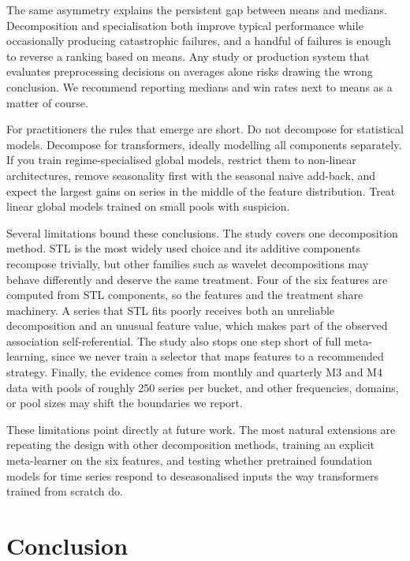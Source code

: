 \documentclass[pdflatex,sn-mathphys-num]{sn-jnl}
\theoremstyle{thmstyleone}
\theoremstyle{thmstyletwo}
\theoremstyle{thmstylethree}
\begin{document}
The same asymmetry explains the persistent gap between means and medians.
Decomposition and specialisation both improve typical performance while
occasionally producing catastrophic failures, and a handful of failures is
enough to reverse a ranking based on means. Any study or production system
that evaluates preprocessing decisions on averages alone risks drawing the
wrong conclusion. We recommend reporting medians and win rates next to means
as a matter of course.

For practitioners the rules that emerge are short. Do not decompose for
statistical models. Decompose for transformers, ideally modelling all
components separately. If you train regime-specialised global models, restrict
them to non-linear architectures, remove seasonality first with the seasonal
naive add-back, and expect the largest gains on series in the middle of the
feature distribution. Treat linear global models trained on small pools with
suspicion.

Several limitations bound these conclusions. The study covers one
decomposition method. STL is the most widely used choice and its additive
components recompose trivially, but other families such as wavelet
decompositions may behave differently and deserve the same treatment. Four of
the six features are computed from STL components, so the features and the
treatment share machinery. A series that STL fits poorly receives both an
unreliable decomposition and an unusual feature value, which makes part of the
observed association self-referential. The study also stops one step short of
full meta-learning, since we never train a selector that maps features to a
recommended strategy. Finally, the evidence comes from monthly and quarterly
M3 and M4 data with pools of roughly 250 series per bucket, and other
frequencies, domains, or pool sizes may shift the boundaries we report.

These limitations point directly at future work. The most natural extensions
are repeating the design with other decomposition methods, training an
explicit meta-learner on the six features, and testing whether pretrained
foundation models for time series respond to deseasonalised inputs the way
transformers trained from scratch do.

\section{Conclusion}\label{sec:conclusion}
\end{document}
